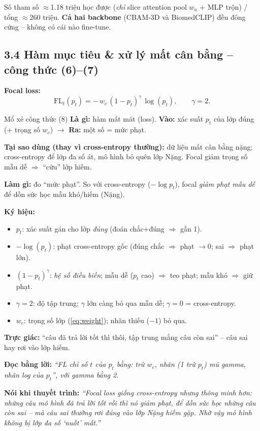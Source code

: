 \documentclass[12pt,a4paper]{article}
\begin{document}
\begin{keybox}{Số tham số}
$\approx$1.18 triệu học được (\emph{chỉ} slice attention pool $w_a$ + MLP trộn) / tổng $\approx$260 triệu. \textbf{Cả hai backbone} (CBAM-3D và BiomedCLIP) đều đông cứng -- không có cái nào fine-tune.
\end{keybox}

\subsection{3.4 Hàm mục tiêu \& xử lý mất cân bằng -- công thức (6)--(7)}\label{sec:loss}
\textbf{Focal loss:}
\begin{equation}
\mathrm{FL}_t(p_t)=-\,w_c\,(1-p_t)^{\gamma}\,\log(p_t),\qquad \gamma=2.
\label{eq:focal}
\end{equation}
\begin{ctbox}{Mổ xẻ công thức (8)}
\textbf{Là gì:} hàm mất mát (loss). \quad\textbf{Vào:} xác suất $p_t$ của lớp đúng (+ trọng số $w_c$) $\to$ \textbf{Ra:} một số = mức phạt.

\textbf{Tại sao dùng (thay vì cross-entropy thường):} dữ liệu mất cân bằng nặng; cross-entropy để lớp đa số át, mô hình bỏ quên lớp Nặng. Focal giảm trọng số mẫu dễ $\Rightarrow$ ``cứu'' lớp hiếm.

\textbf{Làm gì:} đo ``mức phạt''. So với cross-entropy ($-\log p_t$), focal \emph{giảm phạt mẫu dễ} để dồn sức học mẫu khó/hiếm (Nặng).

\textbf{Ký hiệu:}
\begin{itemize}[leftmargin=1.4em,itemsep=1pt]
\item $p_t$: xác suất gán cho lớp \emph{đúng} (đoán chắc+đúng $\Rightarrow$ gần 1).
\item $-\log(p_t)$: phạt cross-entropy gốc (đúng chắc $\Rightarrow$ phạt $\to$0; sai $\Rightarrow$ phạt lớn).
\item $(1-p_t)^{\gamma}$: \emph{hệ số điều biến}; mẫu dễ ($p_t$ cao) $\Rightarrow$ teo phạt; mẫu khó $\Rightarrow$ giữ phạt.
\item $\gamma=2$: độ tập trung; $\gamma$ lớn càng bỏ qua mẫu dễ; $\gamma=0$ = cross-entropy.
\item $w_c$: trọng số lớp (\ref{eq:weight}); nhãn thiếu ($-1$) bỏ qua.
\end{itemize}
\textbf{Trực giác:} ``câu đã trả lời tốt thì thôi, tập trung mắng câu còn sai'' -- câu sai hay rơi vào lớp hiếm.

\textbf{Đọc bằng lời:} \emph{``FL chỉ số $t$ của $p_t$ bằng: trừ $w_c$, nhân (1 trừ $p_t$) mũ gamma, nhân log của $p_t$'', với gamma bằng 2.}

\textbf{Nói khi thuyết trình:} \emph{``Focal loss giống cross-entropy nhưng thông minh hơn: những câu mô hình đã trả lời tốt rồi thì nó giảm phạt, để dồn sức học những câu còn sai -- mà câu sai thường rơi đúng vào lớp Nặng hiếm gặp. Nhờ vậy mô hình không bị lớp đa số `nuốt' mất.''}
\end{ctbox}
\end{document}
